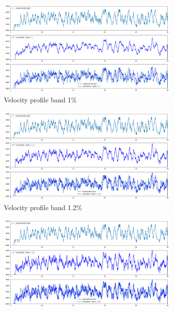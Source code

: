 \documentclass[10pt,fleqn,a4paper,twoside]{article}
\begin{document}
\begin{figure}[H]
\begin{subfigure}{0.4\textwidth}
            \includegraphics[width=\textwidth]{Figures/rpm_analysis_mic8_band_1.png}
            \caption{Velocity profile band 1\%}
            \label{fig:fourth}
        \end{subfigure}
        \centering
        \hfill
        \begin{subfigure}{0.4\textwidth}
            \includegraphics[width=\textwidth]{Figures/rpm_analysis_mic8_band_1.2.png}
            \caption{Velocity profile band 1.2\%}
            \label{fig:fifth}
        \end{subfigure}
        \centering
        \hfill
        \begin{subfigure}{0.4\textwidth}
            \includegraphics[width=\textwidth]{Figures/rpm_analysis_mic8_band_1.5.png}

\end{subfigure}
\end{figure}
\end{document}
